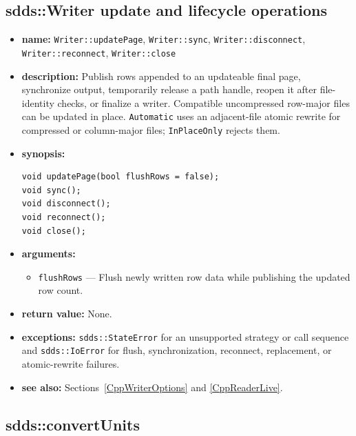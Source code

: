 \documentclass[11pt]{article}
\begin{document}
\subsection{sdds::Writer update and lifecycle operations}
\label{CppWriterUpdate}

\begin{itemize}
\item {\bf name:}\newline
{\tt Writer::updatePage}, {\tt Writer::sync}, {\tt Writer::disconnect},
{\tt Writer::reconnect}, {\tt Writer::close}
\item {\bf description:}\newline
Publish rows appended to an updateable final page, synchronize output,
temporarily release a path handle, reopen it after file-identity checks, or
finalize a writer.  Compatible uncompressed row-major files can be updated in
place.  {\tt Automatic} uses an adjacent-file atomic rewrite for compressed or
column-major files; {\tt InPlaceOnly} rejects them.
\item {\bf synopsis:}
\begin{verbatim}
void updatePage(bool flushRows = false);
void sync();
void disconnect();
void reconnect();
void close();
\end{verbatim}
\item {\bf arguments:}
\begin{itemize}
\item {\tt flushRows} --- Flush newly written row data while publishing the
updated row count.
\end{itemize}
\item {\bf return value:}\newline
None.
\item {\bf exceptions:}\newline
{\tt sdds::StateError} for an unsupported strategy or call sequence and
{\tt sdds::IoError} for flush, synchronization, reconnect, replacement, or
atomic-rewrite failures.
\item {\bf see also:}\newline
Sections~\ref{CppWriterOptions} and \ref{CppReaderLive}.
\end{itemize}

\subsection{sdds::convertUnits}
\label{CppConvertUnits}
\end{document}
